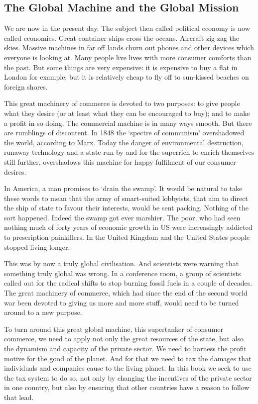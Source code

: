 \documentclass[]{tufte-handout}
\begin{document}
\hypertarget{the-global-machine-and-the-global-mission}{%
\subsection{The Global Machine and the Global
Mission}\label{the-global-machine-and-the-global-mission}}

We are now in the present day. The subject then called political economy
is now called economics. Great container ships cross the oceans.
Aircraft zig-zag the skies. Massive machines in far off lands churn out
phones and other devices which everyone is looking at. Many people live
lives with more consumer comforts than the past. But some things are
very expensive: it is expensive to buy a flat in London for example; but
it is relatively cheap to fly off to sun-kissed beaches on foreign
shores.

This great machinery of commerce is devoted to two purposes: to give
people what they desire (or at least what they can be encouraged to
buy); and to make a profit in so doing. The commercial machine is in
many ways smooth. But there are rumblings of discontent. In 1848 the
`spectre of communism' overshadowed the world, according to Marx. Today
the danger of environmental destruction, runaway technology and a state
run by and for the superrich to enrich themselves still further,
overshadows this machine for happy fulfilment of our consumer desires.

In America, a man promises to `drain the swamp'. It would be natural to
take these words to mean that the army of smart-suited lobbyists, that
aim to direct the ship of state to favour their interests, would be sent
packing. Nothing of the sort happened. Indeed the swamp got ever
marshier. The poor, who had seen nothing much of forty years of economic
growth in US were increasingly addicted to prescription painkillers. In
the United Kingdom and the United States people stopped living longer.

This was by now a truly global civilisation. And scientists were warning
that something truly global was wrong. In a conference room, a group of
scientists called out for the radical shifts to stop burning fossil
fuels in a couple of decades. The great machinery of commerce, which had
since the end of the second world war been devoted to giving us more and
more stuff, would need to be turned around to a new purpose.

To turn around this great global machine, this supertanker of consumer
commerce, we need to apply not only the great resources of the state,
but also the dynamism and capacity of the private sector. We need to
harness the profit motive for the good of the planet. And for that we
need to tax the damages that individuals and companies cause to the
living planet. In this book we seek to use the tax system to do so, not
only by changing the incentives of the private sector in one country,
but also by ensuring that other countries have a reason to follow that
lead.
\end{document}
